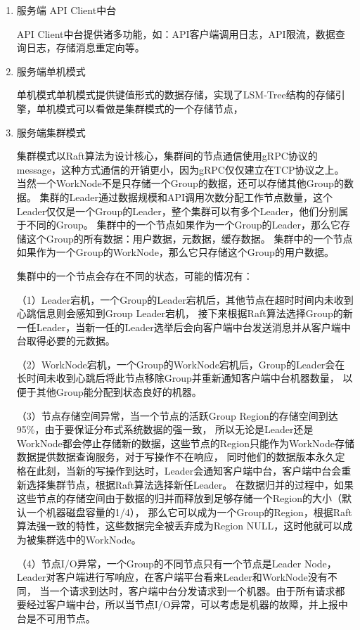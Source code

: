 		\begin{enumerate}[fullwidth,itemindent=2em,listparindent=2em]
			\item 服务端 API Client中台
			
			API Client中台提供诸多功能，如：API客户端调用日志，API限流，数据查询日志，存储消息重定向等。

			\item 服务端单机模式
			
			单机模式单机模式提供键值形式的数据存储，实现了LSM-Tree结构的存储引擎，单机模式可以看做是集群模式的一个存储节点，
			
			\item 服务端集群模式
			
			集群模式以Raft算法为设计核心，集群间的节点通信使用gRPC协议的message，这种方式通信的开销更小，因为gRPC仅仅建立在TCP协议之上。
			当然一个WorkNode不是只存储一个Group的数据，还可以存储其他Group的数据。
			集群的Leader通过数据规模和API调用次数分配工作节点数量，这个Leader仅仅是一个Group的Leader，整个集群可以有多个Leader，他们分别属于不同的Group。
			集群中的一个节点如果作为一个Group的Leader，那么它存储这个Group的所有数据：用户数据，元数据，缓存数据。
			集群中的一个节点如果作为一个Group的WorkNode，那么它只存储这个Group的用户数据。
			
			集群中的一个节点会存在不同的状态，可能的情况有：
	
			（1）Leader宕机，一个Group的Leader宕机后，其他节点在超时时间内未收到心跳信息则会感知到Group Leader宕机，
			接下来根据Raft算法选择Group的新一任Leader，当新一任的Leader选举后会向客户端中台发送消息并从客户端中台取得必要的元数据。
			
			（2）WorkNode宕机，一个Group的WorkNode宕机后，Group的Leader会在长时间未收到心跳后将此节点移除Group并重新通知客户端中台机器数量，
			以便于其他Group能分配到状态良好的机器。
			
			（3）节点存储空间异常，当一个节点的活跃Group Region的存储空间到达95\%，由于要保证分布式系统数据的强一致，
			所以无论是Leader还是WorkNode都会停止存储新的数据，这些节点的Region只能作为WorkNode存储数据提供数据查询服务，对于写操作不在响应，
			同时他们的数据版本永久定格在此刻，当新的写操作到达时，Leader会通知客户端中台，客户端中台会重新选择集群节点，根据Raft算法选择新任Leader。
			在数据归并的过程中，如果这些节点的存储空间由于数据的归并而释放到足够存储一个Region的大小（默认一个机器磁盘容量的1/4），
			那么它可以成为一个Group的Region，根据Raft算法强一致的特性，这些数据完全被丢弃成为Region NULL，这时他就可以成为被集群选中的WorkNode。
	
			（4）节点I/O异常，一个Group的不同节点只有一个节点是Leader Node，Leader对客户端进行写响应，在客户端平台看来Leader和WorkNode没有不同，
			当一个请求到达时，客户端中台分发请求到一个机器。由于所有请求都要经过客户端中台，所以当节点I/O异常，可以考虑是机器的故障，并上报中台是不可用节点。
	

\end{enumerate}
